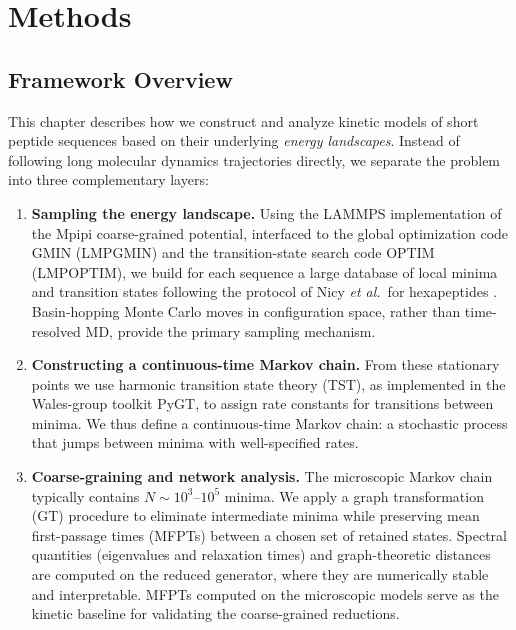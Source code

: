 \chapter{Methods}\label{ch:methods}

\section{Framework Overview}\label{sec:framework}

This chapter describes how we construct and analyze kinetic models of
short peptide sequences based on their underlying \emph{energy landscapes}.
Instead of following long molecular dynamics trajectories directly, we
separate the problem into three complementary layers:

\begin{enumerate}
  \item \textbf{Sampling the energy landscape.} Using the LAMMPS
        implementation of the Mpipi coarse-grained potential, interfaced
        to the global optimization code GMIN (LMPGMIN) and the transition-state
        search code OPTIM (LMPOPTIM), we build for each sequence a large
        database of local minima and transition states following the
        protocol of Nicy \emph{et al.}\ for hexapeptides \cite{Nicy2024Mpipi}.
        Basin-hopping Monte Carlo moves in configuration space, rather
        than time-resolved MD, provide the primary sampling mechanism.

  \item \textbf{Constructing a continuous-time Markov chain.} From these
        stationary points we use harmonic transition state theory (TST),
        as implemented in the Wales-group toolkit PyGT, to assign rate
        constants for transitions between minima. We thus define a
        continuous-time Markov chain: a stochastic process that jumps
        between minima with well-specified rates.

  \item \textbf{Coarse-graining and network analysis.} The microscopic Markov chain
      typically contains $N\sim 10^3$--$10^5$ minima. We apply a graph transformation
      (GT) procedure to eliminate intermediate minima while preserving mean first-passage
      times (MFPTs) between a chosen set of retained states. Spectral quantities
      (eigenvalues and relaxation times) and graph-theoretic distances are computed on
      the reduced generator, where they are numerically stable and interpretable. MFPTs
      computed on the microscopic models serve as the kinetic baseline for validating the
      coarse-grained reductions.
\end{enumerate}

